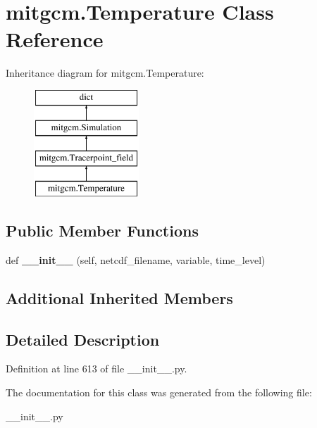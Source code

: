 \hypertarget{classmitgcm_1_1Temperature}{}\section{mitgcm.\+Temperature Class Reference}
\label{classmitgcm_1_1Temperature}
Inheritance diagram for mitgcm.\+Temperature\+:\begin{figure}[H]
\begin{center}
\leavevmode
\includegraphics[height=4.000000cm]{classmitgcm_1_1Temperature}
\end{center}
\end{figure}
\subsection*{Public Member Functions}
\begin{DoxyCompactItemize}
\item 
\hypertarget{classmitgcm_1_1Temperature_a8e1f6ba4094ae33fb8e0f29a5ff083e3}{}def {\bfseries \+\_\+\+\_\+init\+\_\+\+\_\+} (self, netcdf\+\_\+filename, variable, time\+\_\+level)\label{classmitgcm_1_1Temperature_a8e1f6ba4094ae33fb8e0f29a5ff083e3}

\end{DoxyCompactItemize}
\subsection*{Additional Inherited Members}


\subsection{Detailed Description}


Definition at line 613 of file \+\_\+\+\_\+init\+\_\+\+\_\+.\+py.



The documentation for this class was generated from the following file\+:\begin{DoxyCompactItemize}
\item 
\+\_\+\+\_\+init\+\_\+\+\_\+.\+py\end{DoxyCompactItemize}

